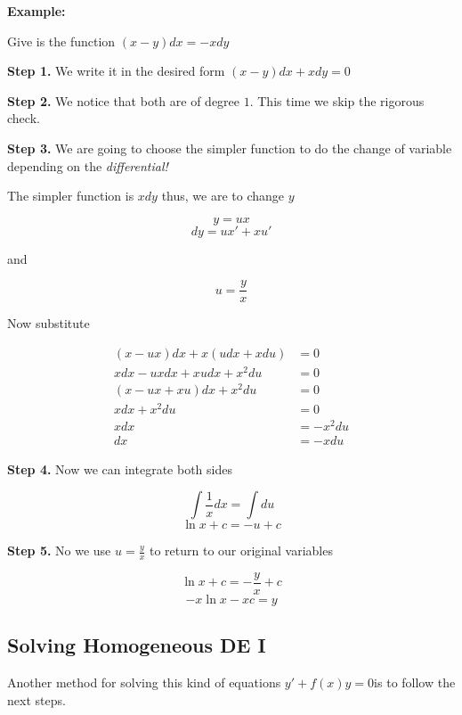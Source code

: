 \textbf{Example:}
\vspace{\baselineskip}


Give is the function \((x -y)dx = - xdy\)
\vspace{\baselineskip}

\textbf{Step 1.} We write it in the desired form \((x - y)dx + xdy = 0\)
\vspace{\baselineskip}

\textbf{Step 2.} We notice that both are of degree \(1\). This time we skip the rigorous check.
\vspace{\baselineskip}

\textbf{Step 3.} We are going to choose the simpler function to do the change of variable 
depending on the \emph{differential!} 
\vspace{\baselineskip}

The simpler function is \(xdy\) thus, we are to change \(y\)

\[
    y = ux
\]
\[
    dy = ux' + xu'
\]

and 

\[
    u = \frac{y}{x}
\]

Now substitute

\begin{align*}
    (x - ux)dx + x(udx + xdu) &= 0\\
    xdx - u x dx + x u dx + x^{2}du &= 0\\
    (x - ux + xu)dx + x^{2}du &= 0\\
    xdx + x^{2}du &= 0\\
    xdx &= - x^{2}du\\
    dx &= - xdu
\end{align*}

\textbf{Step 4.} Now we can integrate both sides

\[
    \int \frac{1}{x}dx = \int du
\]
\[
    \ln x + c = -u + c
\]

\textbf{Step 5.} No we use \(u = \frac{y}{x}\) to return to our original variables

\[
    \ln x + c = -\frac{y}{x} + c
\]
\[
    -x\ln x - xc = y
\]

\subsection{Solving Homogeneous DE I}

Another method for solving this kind of equations \(y' + f(x)y = 0\)is to follow the next steps.
\vspace{\baselineskip}

